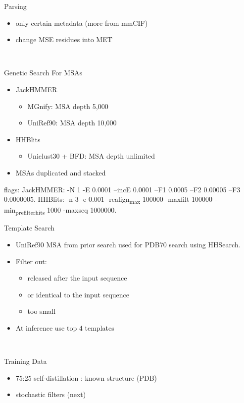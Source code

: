 \documentclass[presentation, smaller]{beamer}
\begin{document}
\begin{frame}[label={sec:org15116e8}]{Parsing}
\begin{itemize}
\item only certain metadata (more from mmCIF)
\item change MSE residues into MET
\end{itemize}~\cite{jumperHighlyAccurateProtein2021}
\end{frame}
\begin{frame}[label={sec:orge64af38}]{Genetic Search}
For MSAs
\begin{itemize}
\item JackHMMER
\begin{itemize}
\item MGnify: MSA depth 5,000
\item UniRef90: MSA depth 10,000
\end{itemize}
\item HHBlits
\begin{itemize}
\item Uniclust30 + BFD: MSA depth unlimited
\end{itemize}
\item MSAs duplicated and stacked
\end{itemize}

flags:
  JackHMMER: -N 1 -E 0.0001 --incE 0.0001 --F1 0.0005 --F2 0.00005 --F3 0.0000005.
  HHBlits: -n 3 -e 0.001 -realign\textsubscript{max} 100000 -maxfilt 100000 -min\textsubscript{prefilter}\textsubscript{hits} 1000 -maxseq 1000000.~\cite{jumperHighlyAccurateProtein2021}
\end{frame}
\begin{frame}[label={sec:org6c39bdf}]{Template Search}
\begin{itemize}
\item UniRef90 MSA from prior search used for PDB70 search using HHSearch.
\item Filter out:
\begin{itemize}
\item released after the input sequence
\item or identical to the input sequence
\item too small
\end{itemize}
\item At inference use top 4 templates
\end{itemize}~\cite{jumperHighlyAccurateProtein2021}
\end{frame}
\begin{frame}[label={sec:orgd977393}]{Training Data}
\begin{itemize}
\item 75:25 self-distillation : known structure (PDB)
\item stochastic filters (next)
\end{itemize}~\cite{jumperHighlyAccurateProtein2021}
\end{frame}
\end{document}
